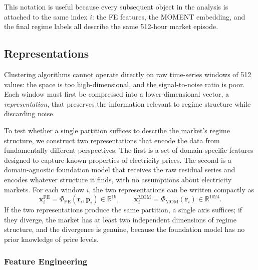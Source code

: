 \documentclass[12pt]{article}
\begin{document}
\noindent This notation is useful because every subsequent object in the analysis is attached to the same index $i$: the FE features, the MOMENT embedding, and the final regime labels all describe the same 512-hour market episode.

\subsection{Representations}
\label{sec:representations}

Clustering algorithms cannot operate directly on raw time-series windows of 512 values: the space is too high-dimensional, and the signal-to-noise ratio is poor.
Each window must first be compressed into a lower-dimensional vector, a \emph{representation}, that preserves the information relevant to regime structure while discarding noise.

To test whether a single partition suffices to describe the market's regime structure, we construct two representations that encode the data from fundamentally different perspectives.
The first is a set of domain-specific features designed to capture known properties of electricity prices.
The second is a domain-agnostic foundation model that receives the raw residual series and encodes whatever structure it finds, with no assumptions about electricity markets.
For each window $i$, the two representations can be written compactly as
\begin{equation}
\mathbf{x}_i^\text{FE} = \Phi_\text{FE}(\mathbf{r}_i,\mathbf{p}_i) \in \mathbb{R}^{19},
\qquad
\mathbf{x}_i^\text{MOM} = \Phi_\text{MOM}(\mathbf{r}_i) \in \mathbb{R}^{1024}.
\label{eq:representations}
\end{equation}
If the two representations produce the same partition, a single axis suffices; if they diverge, the market has at least two independent dimensions of regime structure, and the divergence is genuine, because the foundation model has no prior knowledge of price levels.

\subsubsection{Feature Engineering}
\label{sec:repr_fe}
\end{document}
